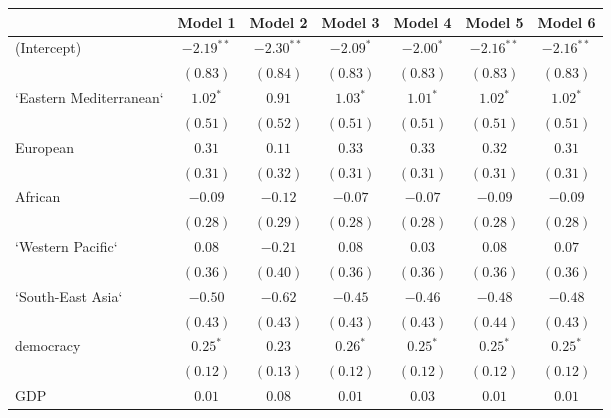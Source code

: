 
\begin{table}[!h]
\begin{center}
\begin{tabular}{l c c c c c c }
\toprule
 & Model 1 & Model 2 & Model 3 & Model 4 & Model 5 & Model 6 \\
\midrule
(Intercept)             & $-2.19^{**}$ & $-2.30^{**}$ & $-2.09^{*}$  & $-2.00^{*}$  & $-2.16^{**}$ & $-2.16^{**}$ \\
                        & $(0.83)$     & $(0.84)$     & $(0.83)$     & $(0.83)$     & $(0.83)$     & $(0.83)$     \\
`Eastern Mediterranean` & $1.02^{*}$   & $0.91$       & $1.03^{*}$   & $1.01^{*}$   & $1.02^{*}$   & $1.02^{*}$   \\
                        & $(0.51)$     & $(0.52)$     & $(0.51)$     & $(0.51)$     & $(0.51)$     & $(0.51)$     \\
European                & $0.31$       & $0.11$       & $0.33$       & $0.33$       & $0.32$       & $0.31$       \\
                        & $(0.31)$     & $(0.32)$     & $(0.31)$     & $(0.31)$     & $(0.31)$     & $(0.31)$     \\
African                 & $-0.09$      & $-0.12$      & $-0.07$      & $-0.07$      & $-0.09$      & $-0.09$      \\
                        & $(0.28)$     & $(0.29)$     & $(0.28)$     & $(0.28)$     & $(0.28)$     & $(0.28)$     \\
`Western Pacific`       & $0.08$       & $-0.21$      & $0.08$       & $0.03$       & $0.08$       & $0.07$       \\
                        & $(0.36)$     & $(0.40)$     & $(0.36)$     & $(0.36)$     & $(0.36)$     & $(0.36)$     \\
`South-East Asia`       & $-0.50$      & $-0.62$      & $-0.45$      & $-0.46$      & $-0.48$      & $-0.48$      \\
                        & $(0.43)$     & $(0.43)$     & $(0.43)$     & $(0.43)$     & $(0.44)$     & $(0.43)$     \\
democracy               & $0.25^{*}$   & $0.23$       & $0.26^{*}$   & $0.25^{*}$   & $0.25^{*}$   & $0.25^{*}$   \\
                        & $(0.12)$     & $(0.13)$     & $(0.12)$     & $(0.12)$     & $(0.12)$     & $(0.12)$     \\
GDP                     & $0.01$       & $0.08$       & $0.01$       & $0.03$       & $0.01$       & $0.01$       \\

\end{tabular}
\end{center}
\end{table}
